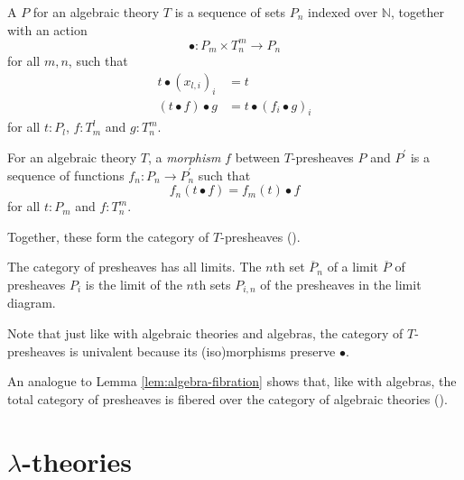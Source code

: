 \begin{definition}
  A  $ P $ for an algebraic theory $ T $ is a sequence of sets $ P_n $ indexed over $ \mathbb N $, together with an action
  \[ \bullet: P_m \times T_n^m \to P_n \]
  for all $ m, n $, such that
  \begin{align*}
    t \bullet (x_{l, i})_i &= t\\
    (t \bullet f) \bullet g &= t \bullet (f_i \bullet g)_i
  \end{align*}
  for all $ t: P_l $, $ f: T_m^l $ and $ g: T_n^m $.
\end{definition}

\begin{definition}
  For an algebraic theory $ T $, a \textit{morphism} $ f $ between $ T $-presheaves $ P $ and $ P^\prime $ is a sequence of functions $ f_n: P_n \to P^\prime_n $ such that
  \[ f_n(t \bullet f) = f_m(t) \bullet f \]
  for all $ t: P_m $ and $ f: T_n^m $.
\end{definition}

Together, these form the category of $ T $-presheaves  ().

\begin{remark}
  The category of presheaves has all limits. The $ n $th set $ \overline{P}_n $ of a limit $ \overline{P} $ of presheaves $ P_i $ is the limit of the $ n $th sets $ P_{i, n} $ of the presheaves in the limit diagram.
\end{remark}

\begin{remark}
  Note that just like with algebraic theories and algebras, the category of $ T $-presheaves is univalent because its (iso)morphisms preserve $ \bullet $.
\end{remark}

An analogue to Lemma \ref{lem:algebra-fibration} shows that, like with algebras, the total category of presheaves is fibered over the category of algebraic theories ().

\section{\texorpdfstring{$ \lambda $-}{lambda-}theories}

